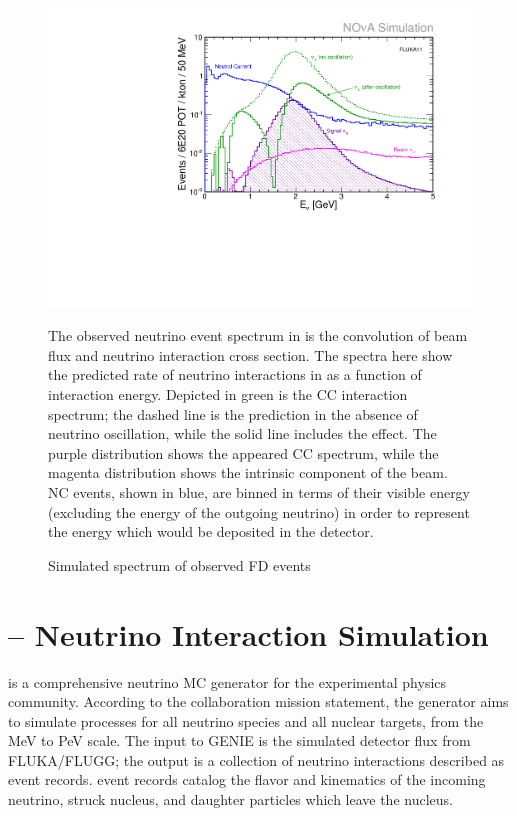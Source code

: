\begin{figure}
\begin{center}
\includegraphics[width=\textwidth]{figures/plots/nova/beam_flux_log.pdf}
\end{center}
\caption{Simulated spectrum of observed FD events}{
The observed neutrino event spectrum in \nova is the convolution
of \numi beam flux and neutrino interaction cross section.
The spectra here show the predicted rate of neutrino interactions
in \nova as a function of interaction energy.
Depicted in green is the \numu CC interaction spectrum; the dashed line
is the prediction in the absence of neutrino oscillation, while
the solid line includes the effect.
The purple distribution shows the appeared \nue CC spectrum,
while the magenta distribution shows the intrinsic \nue component
of the beam.
NC events, shown in blue, are binned in terms of their visible energy
(excluding the energy of the outgoing neutrino) in order to represent
the energy which would be deposited in the detector.
}
\label{beam_flux_fig}
\end{figure}



\section{\genie -- Neutrino Interaction Simulation}
\label{genie_section}

\genie is a comprehensive neutrino MC generator for the experimental physics community.
According to the \genie collaboration mission statement, the
generator aims to simulate processes  for all neutrino species and all nuclear targets, from the MeV to PeV scale.  The input to GENIE is the simulated detector flux from FLUKA/FLUGG; the output is a collection of neutrino interactions described as \genie event records.  \genie event records catalog the flavor and kinematics of the incoming neutrino, struck nucleus, and daughter particles which leave the nucleus.

